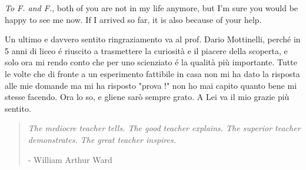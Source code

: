 \textit{To F. and F.}, both of you are not in my life anymore, but I'm sure you would be happy to see me now. If I arrived so far, it is also because of your help.

Un ultimo e davvero sentito ringraziamento va al prof. Dario Mottinelli, perché in 5 anni di liceo é riuscito a trasmettere la curiosit\`a e il piacere della scoperta, e solo ora mi rendo conto che per uno scienziato é la qualit\`a pi\`u importante. Tutte le volte che di fronte a un esperimento fattibile in casa non mi ha dato la risposta alle mie domande ma mi ha risposto "prova !" non ho mai capito quanto bene mi stesse facendo. Ora lo so, e gliene sar\`o sempre grato. A Lei va il mio grazie pi\`u sentito.
\blockquote{
\emph{The mediocre teacher tells. The good teacher explains. The superior teacher demonstrates. The great teacher inspires.}
\begin{flushright}
- William Arthur Ward
\end{flushright}
}%
